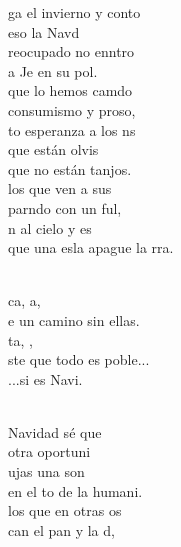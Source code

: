 \documentclass[12pt]{article}
\begin{document}
\begin{multicols*}{2}
\begin{cancion}%
	ga el invierno y conto \\
	eso la Navd\\
	reocupado no enntro \\
	a Je en su pol. \\
	que lo hemos camdo \\
	 consumismo  y proso,\\
	to esperanza a los ns\\
	que están olvis\\
	que no están tanjos. \\
	los que ven a sus \\
	parndo con un ful,\\
	n al cielo y es \\
	que una esla apague la rra.\\\jump\\
	\begin{chorus}%
	ca, a, \\
	e un camino sin ellas. \\
	ta, , \\
	ste que todo es poble...\\
	...si es Navi. \\
	\end{chorus}%
	\jump\\
	Navidad sé que \\
	 otra oportuni\\
	ujas una son\\
	en el to de la humani.\\
	los que en otras os\\
	can el pan y la d, \\

\end{cancion}
\end{multicols*}
\end{document}
